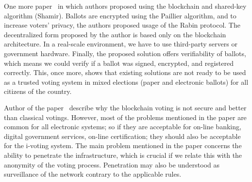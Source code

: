 \documentclass[applsci,article,submit,moreauthors,pdftex]{Definitions/mdpi}
\begin{document}
One more paper~\cite{hsiao2017decentralized} in which authors proposed using the blockchain and shared-key algorithm (Shamir). Ballots are encrypted using the Paillier algorithm, and to increase voters' privacy, the authors proposed usage of the Rabin protocol. The decentralized form proposed by the author is based only on the blockchain architecture. In a real-scale environment, we have to use third-party servers or government hardware. Finally, the proposed solution offers verifiability of ballots, which means we could verify if a ballot was signed, encrypted, and registered correctly. This, once more, shows that existing solutions are not ready to be used as a trusted voting system in mixed elections (paper and electronic ballots) for all citizens of the country. 


Author of the paper~\cite{jeffersonmyth} describe why the blockchain voting is not secure and better than classical votings. However, most of the problems mentioned in the paper are common for all electronic systems; so if they are acceptable for on-line banking, digital government services, on-line certification; they should also be acceptable for the i-voting system. The main problem mentioned in the paper concerns the ability to penetrate the infrastructure, which is crucial if we relate this with the anonymity of the voting process. Penetration may also be understood as surveillance of the network contrary to the applicable rules. 



\end{document}
